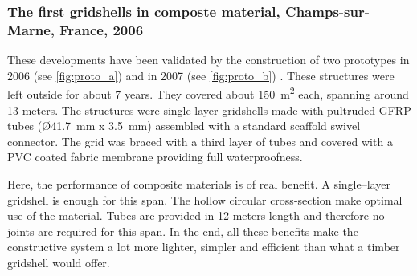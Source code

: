 
\subsubsection{The first gridshells in composte material, Champs-sur-Marne, France, 2006}
\label{sec=proto}
These developments have been validated by the construction of two prototypes in 2006 (see \cref{fig:proto_a}) and in 2007 (see \ref{fig:proto_b}) \cite{Douthe2006}. These structures were left outside for about 7 years. They covered about \SI{150}{m^2} each, spanning around 13 meters. The structures were single-layer gridshells made with pultruded GFRP tubes (\O \SI{41.7}{mm} x \SI{3.5}{mm}) assembled with a standard scaffold swivel connector. The grid was braced with a third layer of tubes and covered with a PVC coated fabric membrane providing full waterproofness.

Here, the performance of composite materials is of real benefit. A single--layer gridshell is enough for this span. The hollow circular cross-section make optimal use of the material. Tubes are provided in 12 meters length and therefore no joints are required for this span. In the end, all these benefits make the constructive system a lot more lighter, simpler and efficient than what a timber gridshell would offer.

